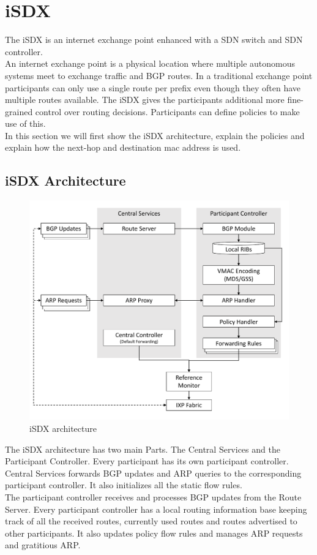 \section{\label{chapter2:iSDX}iSDX}

The iSDX is an internet exchange point enhanced with a SDN switch and SDN controller.\\
An internet exchange point is a physical location where multiple autonomous systems meet to exchange traffic and BGP routes. In a traditional exchange point participants can only use a single route per prefix even though they often have multiple routes available. The iSDX gives the participants additional more fine-grained control over routing decisions. Participants can define policies to make use of this.  \\
In this section we will first show the iSDX architecture, explain the policies and explain how the next-hop and destination mac address is used.

\subsection{\label{chapter2:iSX:iSDX architecture}iSDX Architecture}
\begin{figure}[h]
\includegraphics[scale = 0.4]{Figures/bckdgrnd_sdx_architecture_cropped.pdf}
\caption{iSDX architecture}
\end{figure}

The iSDX architecture has two main Parts. The Central Services and the Participant Controller. Every participant has its own participant controller. \\
Central Services forwards BGP updates and ARP queries to the corresponding participant controller. It also initializes all the static flow rules. \\
The participant controller receives and processes BGP updates from the Route Server. Every participant controller has a local routing information base keeping track of all the received routes, currently used routes and routes advertised to other participants. It also updates policy flow rules and manages ARP requests and gratitious ARP. 

